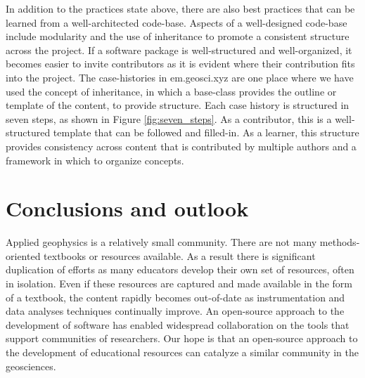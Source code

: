 In addition to the practices state above, there are also best practices that can be learned from a well-architected code-base. Aspects of a well-designed code-base include modularity and the use of inheritance to promote a consistent structure across the project. If a software package is well-structured and well-organized, it becomes easier to invite contributors as it is evident where their contribution fits into the project. The case-histories in em.geosci.xyz are one place where we have used the concept of inheritance, in which a base-class provides the outline or template of the content, to provide structure. Each case history is structured in seven steps, as shown in Figure \ref{fig:seven_steps}. As a contributor, this is a well-structured template that can be followed and filled-in. As a learner, this structure provides consistency across content that is contributed by multiple authors and a framework in which to organize concepts.



\section{Conclusions and outlook}

Applied geophysics is a relatively small community. There are not many methods-oriented textbooks or resources available. As a result there is significant duplication of efforts as many educators develop their own set of resources, often in isolation. Even if these resources are captured and made available in the form of a textbook, the content rapidly becomes out-of-date as instrumentation and data analyses techniques continually improve. An open-source approach to the development of software has enabled widespread collaboration on the tools that support communities of researchers. Our hope is that an open-source approach to the development of educational resources can catalyze a similar community in the geosciences.
